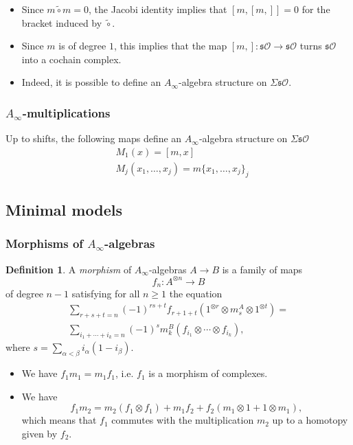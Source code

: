 \documentclass{beamer}
\theoremstyle{definition}
\newtheorem{defi}{Definition}
\begin{document}
\begin{frame}
\begin{itemize}
\item<1-> Since $m\tilde{\circ}m=0$, the Jacobi identity implies that $[m,[m,]]=0$ for the bracket induced by $\tilde{\circ}$.
\item<2-> Since $m$ is of degree $1$, this implies that the map $[m,]:\mathfrak{s}\mathcal{O}\to\mathfrak{s}\mathcal{O}$ turns $\mathfrak{s}\mathcal{O}$ into a cochain complex.
\item<3-> Indeed, it is possible to define an $A_\infty$-algebra structure on $\Sigma\mathfrak{s}\mathcal{O}$. %
\end{itemize}
\end{frame}
\begin{frame}
\frametitle{$A_\infty$-multiplications}
\begin{theorem}
Up to shifts, the following maps define an $A_\infty$-algebra structure on $\Sigma\mathfrak{s}\mathcal{O}$\pause
\begin{align*}
&M_1(x)=[m,x]\\
&M_j(x_1,\dots, x_j)=m\{x_1,\dots, x_j\}_j
\end{align*}
\end{theorem}
\end{frame}
\begin{frame}

\subsection{Minimal models}
\frametitle{Morphisms of $A_\infty$-algebras}
\begin{defi}
A \emph{morphism} of $A_\infty$-algebras $A\to B$ is a family of maps \[f_n:A^{\otimes n}\to B\] of degree $n-1$ satisfying for all $n\geq 1$ the equation
\begin{align*}
\sum_{r+s+t=n} (-1)^{rs+t}f_{r+1+t}(1^{\otimes r} \otimes m^A_s\otimes 1^{\otimes t})=\\
\sum_{i_1+\cdots+i_k=n} (-1)^s m^B_k(f_{i_1}\otimes\cdots\otimes f_{i_k}),
\end{align*}
where
$s=\sum_{\alpha<\beta}i_\alpha(1-i_\beta)$.%
%
\end{defi}

\end{frame}
\begin{frame}
\begin{itemize}
\item<1-> We have $f_1m_1 = m_1f_1$, i.e. $f_1$ is a morphism of complexes.
\item<2-> We have
\[
f_1m_2 = m_2 (f_1\otimes f_1) + m_1f_2 + f_2 (m_1\otimes 1 + 1\otimes m_1),\]
which means that $f_1$ commutes with the multiplication $m_2$ up to a homotopy
given by $f_2$.
\end{itemize}
\end{frame}
\end{document}
